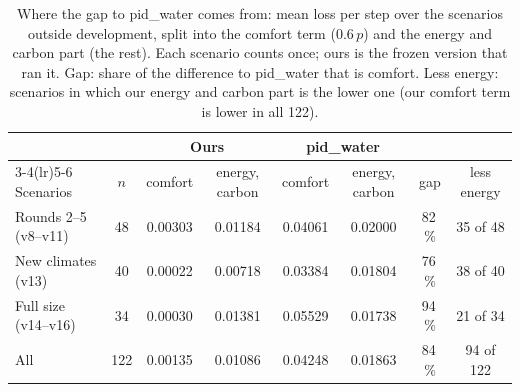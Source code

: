 \documentclass{article}
\begin{document}
\begin{table}[!htb]\centering
\caption{Where the gap to pid\_water comes from: mean loss per step over the scenarios outside development, split into
the comfort term ($0.6\,p$) and the energy and carbon part (the rest). Each scenario counts once; ours is the frozen
version that ran it. Gap: share of the difference to pid\_water that is comfort. Less energy: scenarios in which our
energy and carbon part is the lower one (our comfort term is lower in all 122).}\label{tab:split}
\small
\setlength{\tabcolsep}{4pt}
\begin{tabular}{lccccccc}\toprule
 & & \multicolumn{2}{c}{Ours} & \multicolumn{2}{c}{pid\_water} & & \\\cmidrule(lr){3-4}\cmidrule(lr){5-6}
Scenarios & $n$ & comfort & energy, carbon & comfort & energy, carbon & gap & less energy\\\midrule
Rounds 2--5 (v8--v11) & 48 & 0.00303 & 0.01184 & 0.04061 & 0.02000 & 82\,\% & 35 of 48\\
New climates (v13) & 40 & 0.00022 & 0.00718 & 0.03384 & 0.01804 & 76\,\% & 38 of 40\\
Full size (v14--v16) & 34 & 0.00030 & 0.01381 & 0.05529 & 0.01738 & 94\,\% & 21 of 34\\
All & 122 & 0.00135 & 0.01086 & 0.04248 & 0.01863 & 84\,\% & 94 of 122\\\bottomrule
\end{tabular}
\end{table}
\end{document}

